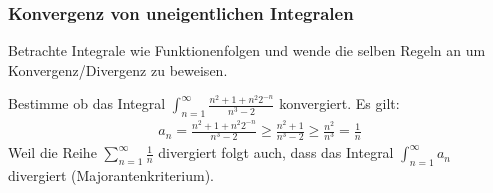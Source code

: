 \documentclass[a4paper]{article}
\begin{document}
	\subsubsection{Konvergenz von uneigentlichen Integralen}
		Betrachte Integrale wie Funktionenfolgen und wende die selben Regeln an um Konvergenz/Divergenz zu beweisen.
		\begin{fmerke}
			Bestimme ob das Integral $\int_{n=1}^\infty \frac{n^2+1+n^2 2^{-n}}{n^3-2}$ konvergiert. Es gilt:
			\begin{align*}
				a_n = \frac{n^2+1+n^2 2^{-n}}{n^3-2} \geq \frac{n^2+1}{n^3-2} \geq \frac{n^2}{n^3} = \frac{1}{n}
			\end{align*}
			Weil die Reihe $\sum_{n=1}^\infty \frac{1}{n}$ divergiert folgt auch, dass das Integral $\int_{n=1}^\infty a_n$ divergiert (Majorantenkriterium).
		\end{fmerke}
\end{document}
